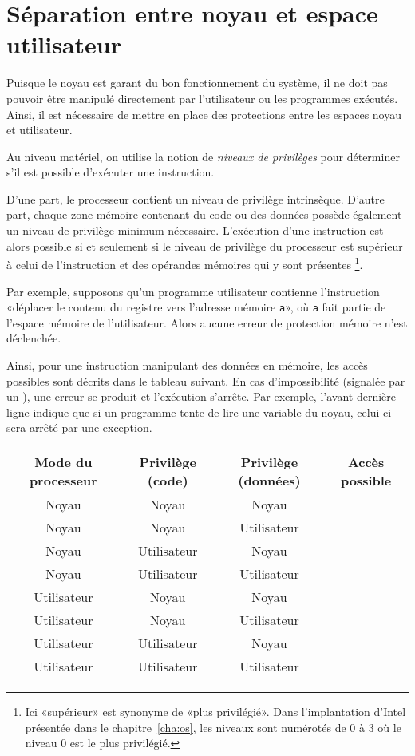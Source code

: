 \section{Séparation entre noyau et espace utilisateur}

Puisque le noyau est garant du bon fonctionnement du système, il ne doit pas
pouvoir être manipulé directement par l'utilisateur ou les programmes exécutés.
Ainsi, il est nécessaire de mettre en place des protections entre les espaces
noyau et utilisateur.

Au niveau matériel, on utilise la notion de \emph{niveaux de privilèges} pour
déterminer s'il est possible d'exécuter une instruction.

D'une part, le processeur contient un niveau de privilège intrinsèque. D'autre
part, \linebreak chaque zone mémoire contenant du code ou des données possède
également un niveau de privilège minimum nécessaire. L'exécution d'une
instruction est alors possible si et seulement si le niveau de privilège du
processeur est supérieur à celui de l'instruction et des opérandes mémoires qui
y sont présentes
\footnote{
  Ici «supérieur» est synonyme de «plus privilégié». Dans l'implantation
  d'Intel présentée dans le chapitre~\ref{cha:os}, les niveaux sont numérotés de
  0 à 3 où le niveau 0 est le plus privilégié.
}.

Par exemple, supposons qu'un programme utilisateur contienne l'instruction
«déplacer le contenu du registre \eax{} vers l'adresse mémoire \texttt{a}», où
\texttt{a} fait partie de l'espace mémoire de l'utilisateur. Alors aucune erreur
de protection mémoire n'est déclenchée.

Ainsi, pour une instruction manipulant des données en mémoire, les accès
possibles sont décrits dans le tableau suivant. En cas d'impossibilité (signalée
par un \Square), une erreur se produit et l'exécution s'arrête. Par exemple,
l'avant-dernière ligne indique que si un programme tente de lire une variable du
noyau, celui-ci sera arrêté par une exception.

\begin{center}
\def\modeK{Noyau\xspace}
\def\modeU{Utilisateur\xspace}
\begin{tabular}{cccc}
\toprule
  Mode du processeur
& Privilège (code)
& Privilège (données)
& Accès possible \\
\midrule
  \modeK{} & \modeK{} & \modeK{} & \CheckedBox{} \\
  \modeK{} & \modeK{} & \modeU{} & \CheckedBox{} \\
  \modeK{} & \modeU{} & \modeK{} & \CheckedBox{} \\
  \modeK{} & \modeU{} & \modeU{} & \CheckedBox{} \\
  \modeU{} & \modeK{} & \modeK{} & \Square{} \\
  \modeU{} & \modeK{} & \modeU{} & \Square{} \\
  \modeU{} & \modeU{} & \modeK{} & \Square{} \\
  \modeU{} & \modeU{} & \modeU{} & \CheckedBox{} \\
\bottomrule
\end{tabular}
\end{center}
\label{page:erreursec}

